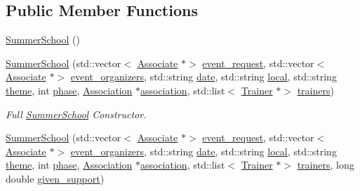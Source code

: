 \subsection*{Public Member Functions}
\begin{DoxyCompactItemize}
\item 
\mbox{\hyperlink{classSummerSchool_af66df445834a36ccb6e67d5503c1b776}{Summer\+School}} ()
\item 
\mbox{\hyperlink{classSummerSchool_a108aeb7981fbb9e6dbe44c1425517ddf}{Summer\+School}} (std\+::vector$<$ \mbox{\hyperlink{classAssociate}{Associate}} $\ast$$>$ \mbox{\hyperlink{classEvent_a6cec387dca85f0a0e8419cfc94eb320e}{event\+\_\+request}}, std\+::vector$<$ \mbox{\hyperlink{classAssociate}{Associate}} $\ast$$>$ \mbox{\hyperlink{classEvent_ad35e04c759fdbfad75aed0b6e2eef63c}{event\+\_\+organizers}}, std\+::string \mbox{\hyperlink{classEvent_a9a93c9d38211f84cd6e347690e177f11}{date}}, std\+::string \mbox{\hyperlink{classEvent_a3d1f28a3bde9ab718d5b0003f8ab5129}{local}}, std\+::string \mbox{\hyperlink{classEvent_aa9cc4378d5cecaadc8e6de92b313e6f8}{theme}}, int \mbox{\hyperlink{classEvent_a4059db56458a92ddb5bd1d1443631b02}{phase}}, \mbox{\hyperlink{classAssociation}{Association}} $\ast$\mbox{\hyperlink{classEvent_a3c8694833e50dbd2e37943eff1f5c9b1}{association}}, std\+::list$<$ \mbox{\hyperlink{classTrainer}{Trainer}} $\ast$$>$ \mbox{\hyperlink{classSummerSchool_a3208a977c13ce8d7415b179a040efae3}{trainers}})
\begin{DoxyCompactList}\small\item\em Full \mbox{\hyperlink{classSummerSchool}{Summer\+School}} Constructor. \end{DoxyCompactList}\item 
\mbox{\hyperlink{classSummerSchool_aa9cbb04b10fee38c90a5a02372878383}{Summer\+School}} (std\+::vector$<$ \mbox{\hyperlink{classAssociate}{Associate}} $\ast$$>$ \mbox{\hyperlink{classEvent_a6cec387dca85f0a0e8419cfc94eb320e}{event\+\_\+request}}, std\+::vector$<$ \mbox{\hyperlink{classAssociate}{Associate}} $\ast$$>$ \mbox{\hyperlink{classEvent_ad35e04c759fdbfad75aed0b6e2eef63c}{event\+\_\+organizers}}, std\+::string \mbox{\hyperlink{classEvent_a9a93c9d38211f84cd6e347690e177f11}{date}}, std\+::string \mbox{\hyperlink{classEvent_a3d1f28a3bde9ab718d5b0003f8ab5129}{local}}, std\+::string \mbox{\hyperlink{classEvent_aa9cc4378d5cecaadc8e6de92b313e6f8}{theme}}, int \mbox{\hyperlink{classEvent_a4059db56458a92ddb5bd1d1443631b02}{phase}}, \mbox{\hyperlink{classAssociation}{Association}} $\ast$\mbox{\hyperlink{classEvent_a3c8694833e50dbd2e37943eff1f5c9b1}{association}}, std\+::list$<$ \mbox{\hyperlink{classTrainer}{Trainer}} $\ast$$>$ \mbox{\hyperlink{classSummerSchool_a3208a977c13ce8d7415b179a040efae3}{trainers}}, long double \mbox{\hyperlink{classSummerSchool_a7e6899945d6a486e9d1d1f581236630b}{given\+\_\+support}})

\end{DoxyCompactItemize}
